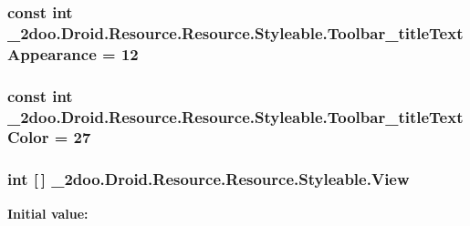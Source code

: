 \hypertarget{class__2doo_1_1_droid_1_1_resource_1_1_styleable_51b384061de37224fe4467ff6022f34a}{
\subsubsection[{Toolbar\_\-titleTextAppearance}]{\setlength{\rightskip}{0pt plus 5cm}const int \_\-2doo.Droid.Resource.Resource.Styleable.Toolbar\_\-titleTextAppearance = 12}}
\label{class__2doo_1_1_droid_1_1_resource_1_1_styleable_51b384061de37224fe4467ff6022f34a}


\hypertarget{class__2doo_1_1_droid_1_1_resource_1_1_styleable_675b0168f26b3eb3afab02d17dcc40f2}{
\subsubsection[{Toolbar\_\-titleTextColor}]{\setlength{\rightskip}{0pt plus 5cm}const int \_\-2doo.Droid.Resource.Resource.Styleable.Toolbar\_\-titleTextColor = 27}}
\label{class__2doo_1_1_droid_1_1_resource_1_1_styleable_675b0168f26b3eb3afab02d17dcc40f2}


\hypertarget{class__2doo_1_1_droid_1_1_resource_1_1_styleable_60ee2cb64d3fb1dd64634bb3d3c24211}{
\subsubsection[{View}]{\setlength{\rightskip}{0pt plus 5cm}int \mbox{[}$\,$\mbox{]} \_\-2doo.Droid.Resource.Resource.Styleable.View}}
\label{class__2doo_1_1_droid_1_1_resource_1_1_styleable_60ee2cb64d3fb1dd64634bb3d3c24211}


\textbf{Initial value:}

